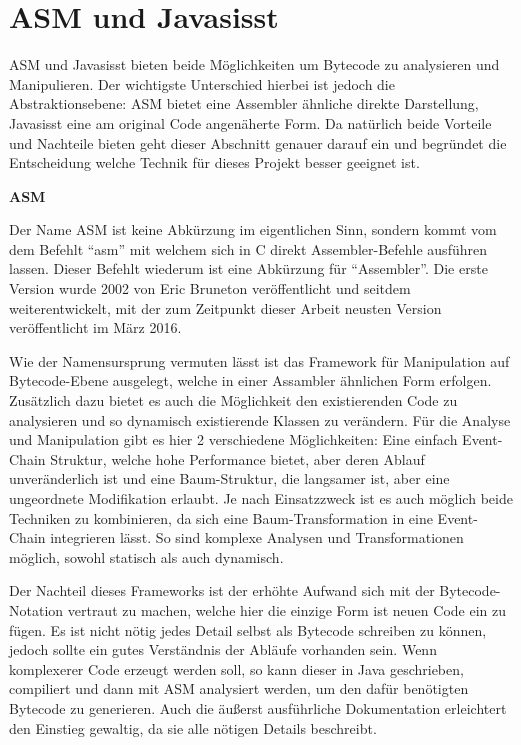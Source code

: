 \section{ASM und Javasisst} 

ASM und Javasisst bieten beide Möglichkeiten um Bytecode zu analysieren und Manipulieren. Der wichtigste Unterschied hierbei ist jedoch die Abstraktionsebene: ASM bietet eine Assembler ähnliche direkte Darstellung, Javasisst eine am original Code angenäherte Form. Da natürlich beide Vorteile und Nachteile bieten geht dieser Abschnitt genauer darauf ein und begründet die Entscheidung welche Technik für dieses Projekt besser geeignet ist.

\textbf{ASM}

Der Name ASM ist keine Abkürzung im eigentlichen Sinn, sondern kommt vom dem Befehlt "`asm"' mit welchem sich in C direkt Assembler-Befehle ausführen lassen. Dieser Befehlt wiederum ist eine Abkürzung für "`Assembler"'. Die erste Version wurde 2002 von Eric Bruneton veröffentlicht und seitdem weiterentwickelt, mit der zum Zeitpunkt dieser Arbeit neusten Version veröffentlicht im März 2016.

Wie der Namensursprung vermuten lässt ist das Framework für Manipulation auf Bytecode-Ebene ausgelegt, welche in einer Assambler ähnlichen Form erfolgen. Zusätzlich dazu bietet es auch die Möglichkeit den existierenden Code zu analysieren und so dynamisch existierende Klassen zu verändern. Für die Analyse und Manipulation gibt es hier 2 verschiedene Möglichkeiten: Eine einfach Event-Chain Struktur, welche hohe Performance bietet, aber deren Ablauf unveränderlich ist und eine Baum-Struktur, die langsamer ist, aber eine ungeordnete Modifikation erlaubt.
Je nach Einsatzzweck ist es auch möglich beide Techniken zu kombinieren, da sich eine Baum-Transformation in eine Event-Chain integrieren lässt. So sind komplexe Analysen und Transformationen möglich, sowohl statisch als auch dynamisch.

Der Nachteil dieses Frameworks ist der erhöhte Aufwand sich mit der Bytecode-Notation vertraut zu machen, welche hier die einzige Form ist neuen Code ein zu fügen. Es ist nicht nötig jedes Detail selbst als Bytecode schreiben zu können, jedoch sollte ein gutes Verständnis der Abläufe vorhanden sein. Wenn komplexerer Code erzeugt werden soll, so kann dieser in Java geschrieben, compiliert und dann mit ASM analysiert werden, um den dafür benötigten Bytecode zu generieren. Auch die äußerst ausführliche Dokumentation erleichtert den Einstieg gewaltig, da sie alle nötigen Details beschreibt.


